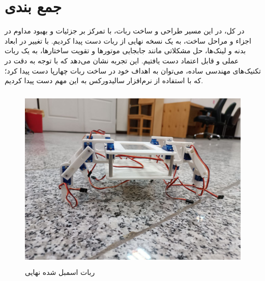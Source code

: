 \newpage	
\section{جمع بندی}
در کل، در این مسیر طراحی و ساخت ربات، با تمرکز بر جزئیات و بهبود مداوم در اجزاء و مراحل ساخت، به یک نسخه نهایی از ربات دست پیدا کردیم. با تغییر در ابعاد بدنه و لینک‌ها، حل مشکلاتی مانند جابجایی موتورها و تقویت ساختارها، به یک ربات عملی و قابل اعتماد دست یافتیم. این تجربه نشان می‌دهد که با توجه به دقت در تکنیک‌های مهندسی ساده، می‌توان به اهداف خود در ساخت ربات‌ چهارپا دست پیدا کرد؛ که با استفاده از نرم‌افزار سالیدورکس به این مهم دست پیدا کردیم.
	\vspace{1cm}
	\begin{figure}[!h]	
	\vspace{0.2cm}
	\centering
	\includegraphics[height=9cm,width=12cm]{./Images/CH2/Assembled_Robot.jpeg}
	\caption{ربات اسمبل شده نهایی}
	\label{ربات اسمبل شده نهایی}
	\end{figure}